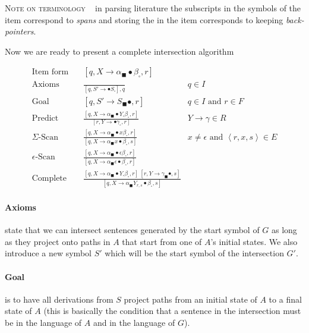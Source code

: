 \documentclass[11pt]{article}
\newcommand{\itembrack}[1]{\ensuremath{\left[ #1 \right]}}
\newcommand{\angbrack}[1]{\ensuremath{\left\langle #1 \right\rangle}}
\begin{document}
\noindent\textsc{Note on terminology} ~ in parsing literature the subscripts in the symbols of the item correspond to \emph{spans} and storing the in the item corresponds to keeping \emph{back-pointers}.


Now we are ready to present a complete intersection algorithm

\begin{align}
\text{Item form} &\quad  \itembrack{q, X \rightarrow \alpha_\blacksquare \bullet \beta_\square, r} \\
\text{Axioms} &\quad \frac{}{\itembrack{q, S' \rightarrow \bullet S_\square}, q} & q \in I\\
\text{Goal} &\quad \itembrack{q, S' \rightarrow S_\blacksquare \bullet, r} & q \in I \text{ and } r \in F\\
\text{Predict} &\quad \frac{\itembrack{q, X \rightarrow \alpha_\blacksquare \bullet Y_\square \beta_\square, r}}{\itembrack{r, Y \rightarrow \bullet \gamma_\square, r}} & Y \rightarrow \gamma \in R \\
\Sigma\text{-Scan} &\quad \frac{\itembrack{q, X \rightarrow \alpha_\blacksquare \bullet x \beta_\square, r}}{\itembrack{q, X \rightarrow \alpha_\blacksquare x \bullet \beta_\square, s}} & x \neq \epsilon \text{ and } \angbrack{r, x, s} \in E \\
\epsilon\text{-Scan} &\quad \frac{\itembrack{q, X \rightarrow \alpha_\blacksquare \bullet \epsilon \beta_\square, r}}{\itembrack{q, X \rightarrow \alpha_\blacksquare \epsilon \bullet \beta_\square, r}} & \\
\text{Complete} &\quad \frac{\itembrack{q, X \rightarrow \alpha_\blacksquare \bullet Y_\square \beta_\square, r} ~ \itembrack{r, Y \rightarrow \gamma_\blacksquare \bullet, s}}{\itembrack{q, X \rightarrow \alpha_\blacksquare Y_{r,s} \bullet \beta_\square, s}}
\end{align}


\paragraph{Axioms} state that we can intersect sentences generated by the start symbol of $G$ as long as they project onto paths in $A$ that start from one of $A$'s initial states. We also introduce a new symbol $S'$ which will be the start symbol of the intersection $G'$.

\paragraph{Goal} is to have all derivations from $S$ project paths from an initial state of $A$ to a final state of $A$ (this is basically the condition that a sentence in the intersection must be in the language of $A$ and in the language of $G$).
\end{document}
